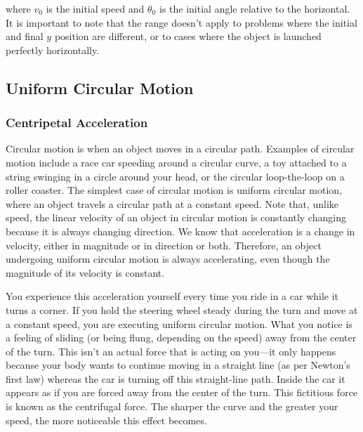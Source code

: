 \documentclass[main-physics.tex]{subfiles}
\begin{document}
where $v_0$ is the initial speed and $\theta_0$ is the initial angle relative to the horizontal. It is important to note that the range doesn't apply to problems where the initial and final $y$ position are different, or to cases where the object is launched perfectly horizontally.

\subsection{Uniform Circular Motion} \label{uPOucv}
\subsubsection*{Centripetal Acceleration}

Circular motion is when an object moves in a circular path. Examples of circular motion include a race car speeding around a circular curve, a toy attached to a string swinging in a circle around your head, or the circular loop-the-loop on a roller coaster. The simplest case of circular motion is \gls{uniform circular motion}, where an object travels a circular path at a constant speed. Note that, unlike speed, the linear velocity of an object in circular motion is constantly changing because it is always changing direction. We know that acceleration is a change in velocity, either in magnitude or in direction or both. Therefore, an object undergoing uniform circular motion is always accelerating, even though the magnitude of its velocity is constant.

\vspace{1em}

You experience this acceleration yourself every time you ride in a car while it turns a corner. If you hold the steering wheel steady during the turn and move at a constant speed, you are executing uniform circular motion. What you notice is a feeling of sliding (or being flung, depending on the speed) away from the center of the turn. This isn't an actual force that is acting on you---it only happens because your body wants to continue moving in a straight line (as per Newton's first law) whereas the car is turning off this straight-line path. Inside the car it appears as if you are forced away from the center of the turn. This fictitious force is known as the \gls{centrifugal force}. The sharper the curve and the greater your speed, the more noticeable this effect becomes.
\end{document}
